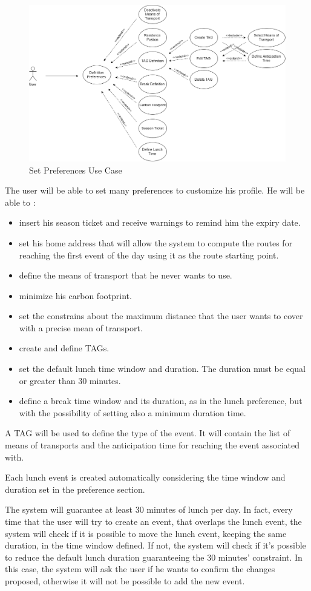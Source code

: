 \begin{figure}[H]
	\centering
	\includegraphics[scale=0.25]{Images/Use_Case/Set_Preferences}
	\caption{Set Preferences Use Case}
\end{figure}
The user will be able to set many preferences to customize his profile. 
He will be able to :
\begin{itemize}
	\setlength{\leftskip}{1cm}
	\item insert his season ticket and receive warnings to remind him the expiry date.
	\item set his home address that will allow the system to compute the routes for reaching the first event of the day using it as the route starting point.
	\item define the means of transport that he never wants to use.
	\item minimize his carbon footprint.
	\item set the constrains about the maximum distance that the user wants to cover with a precise mean of transport.
	\item create and define TAGs.
	\item set the default lunch time window and duration. The duration must be equal or greater than 30 minutes.
	\item define a break time window and its duration, as in the lunch preference, but with the possibility of setting also a minimum duration time.
\end{itemize}\par
A TAG will be used to define the type of the event. It will contain the list of means of transports and the anticipation time for reaching the event associated with.

\newpage
{}
Each lunch event is created automatically considering the time window and duration set in the preference section.\par
The system will guarantee at least 30 minutes of lunch per day. In fact, every time that the user will try to create an event, that overlaps the lunch event, the system will check if it is possible to move the lunch event, keeping the same duration, in the time window defined. If not, the system will check if it’s possible to reduce the default lunch duration guaranteeing the 30 minutes’ constraint. In this case, the system will ask the user if he wants to confirm the changes proposed, otherwise it will not be possible to add the new event.

